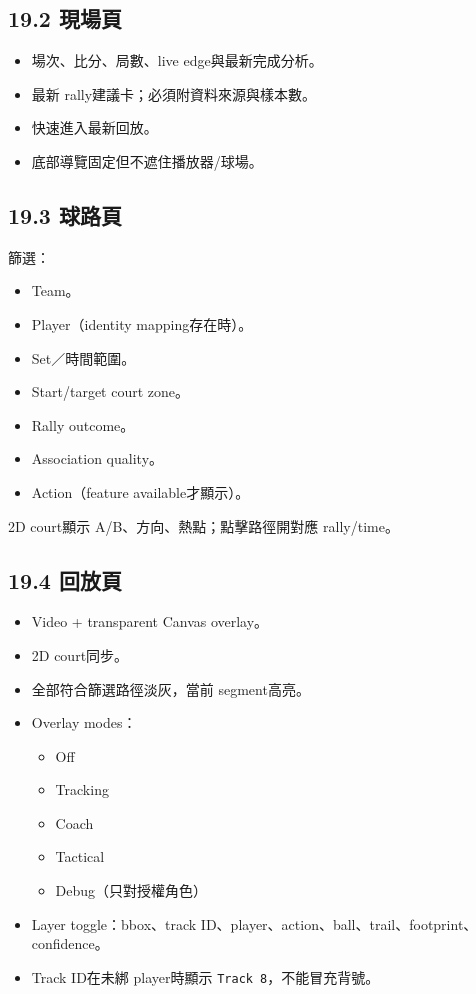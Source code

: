 \documentclass[
  9pt,
  a4paper,
]{article}
\providecommand{\tightlist}{%
  \setlength{\itemsep}{0pt}\setlength{\parskip}{0pt}}
\begin{document}
\subsection{19.2 現場頁}\label{192-ux73feux5834ux9801}

\begin{itemize}
\tightlist
\item
  場次、比分、局數、live edge與最新完成分析。
\item
  最新 rally建議卡；必須附資料來源與樣本數。
\item
  快速進入最新回放。
\item
  底部導覽固定但不遮住播放器/球場。
\end{itemize}

\subsection{19.3 球路頁}\label{193-ux7403ux8defux9801}

篩選：

\begin{itemize}
\tightlist
\item
  Team。
\item
  Player（identity mapping存在時）。
\item
  Set／時間範圍。
\item
  Start/target court zone。
\item
  Rally outcome。
\item
  Association quality。
\item
  Action（feature available才顯示）。
\end{itemize}

2D court顯示 A/B、方向、熱點；點擊路徑開對應 rally/time。

\subsection{19.4 回放頁}\label{194-ux56deux653eux9801}

\begin{itemize}
\tightlist
\item
  Video + transparent Canvas overlay。
\item
  2D court同步。
\item
  全部符合篩選路徑淡灰，當前 segment高亮。
\item
  Overlay modes：

  \begin{itemize}
  \tightlist
  \item
    Off
  \item
    Tracking
  \item
    Coach
  \item
    Tactical
  \item
    Debug（只對授權角色）
  \end{itemize}
\item
  Layer toggle：bbox、track
  ID、player、action、ball、trail、footprint、confidence。
\item
  Track ID在未綁 player時顯示 \texttt{Track\ 8}，不能冒充背號。
\end{itemize}
\end{document}
